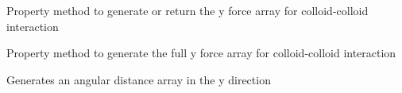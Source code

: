\documentclass[letterpaper,10pt,english]{sphinxmanual}
\begin{document}
\begin{fulllineitems}
\begin{fulllineitems}
\end{fulllineitems}


\begin{fulllineitems}
\label{\detokenize{index:lb_colloids.Colloids.Colloid_Math.ColloidColloid.y}}
Property method to generate or return the y force array for colloid-colloid interaction

\end{fulllineitems}


\begin{fulllineitems}
\label{\detokenize{index:lb_colloids.Colloids.Colloid_Math.ColloidColloid.y_array}}
Property method to generate the full y force array for colloid-colloid interaction

\end{fulllineitems}


\begin{fulllineitems}
\label{\detokenize{index:lb_colloids.Colloids.Colloid_Math.ColloidColloid.y_distance_array}}
Generates an angular distance array in the y direction

\end{fulllineitems}


\end{fulllineitems}

\end{document}

